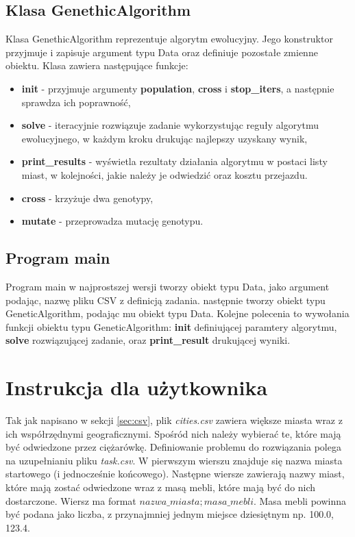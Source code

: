 \documentclass[12pt, oneside, final]{report}
\begin{document}
\subsection{Klasa GenethicAlgorithm}
Klasa GenethicAlgorithm reprezentuje algorytm ewolucyjny. Jego konstruktor przyjmuje i zapisuje argument typu Data oraz definiuje pozostałe zmienne obiektu. Klasa zawiera następujące funkcje:
\begin{itemize}
\item \textbf{init} - przyjmuje argumenty \textbf{population}, \textbf{cross} i \textbf{stop\_iters}, a następnie sprawdza ich poprawność,
\item \textbf{solve} - iteracyjnie rozwiązuje  zadanie wykorzystując reguły algorytmu ewolucyjnego, w każdym kroku drukując najlepszy uzyskany wynik,
\item \textbf{print\_results} - wyświetla rezultaty działania algorytmu w postaci listy miast, w kolejności, jakie należy je odwiedzić oraz kosztu przejazdu.
\item \textbf{cross} - krzyżuje dwa genotypy,
\item \textbf{mutate} - przeprowadza mutację genotypu.
\end{itemize}

\subsection{Program main}
Program main w najprostszej wersji tworzy obiekt typu Data, jako argument podając, nazwę pliku CSV z definicją zadania. następnie tworzy obiekt typu GeneticAlgorithm, podając mu obiekt typu Data. Kolejne polecenia to wywołania funkcji obiektu typu GeneticAlgorithm: \textbf{init} definiującej paramtery algorytmu, \textbf{solve} rozwiązującej zadanie, oraz \textbf{print\_result} drukującej wyniki.

\section{Instrukcja dla użytkownika}
Tak jak napisano w sekcji \ref{sec:csv}, plik \textit{cities.csv} zawiera większe miasta wraz z ich współrzędnymi geograficznymi. Spośród nich należy wybierać te, które mają być odwiedzone przez ciężarówkę. Definiowanie problemu do rozwiązania polega na uzupełnianiu pliku \textit{task.csv}. W pierwszym wierszu znajduje się nazwa miasta startowego (i jednocześnie końcowego). Następne wiersze zawierają nazwy miast, które mają zostać odwiedzone wraz z masą mebli, które mają być do nich dostarczone. Wiersz ma format $nazwa\_miasta;masa\_mebli$. Masa mebli powinna być podana jako liczba, z przynajmniej jednym miejsce dziesiętnym np. 100.0, 123.4.
\end{document}
